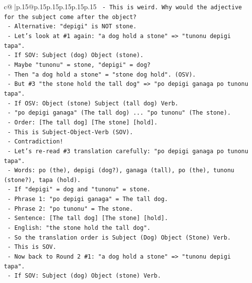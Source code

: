 \documentclass{article}
\begin{document}
{\begin{supertabular}{c@{$\;$}|p{.15\linewidth}@{}p{.15\linewidth}p{.15\linewidth}p{.15\linewidth}p{.15\linewidth}p{.15\linewidth}}
{{{\texttt{      {-} This is weird. Why would the adjective for the subject come after the object?} \\
\texttt{      {-} Alternative: "depigi" is NOT stone.} \\
\texttt{      {-} Let's look at \#1 again: "a dog hold a stone" => "tunonu depigi tapa".} \\
\texttt{      {-} If SOV: Subject (dog) Object (stone).} \\
\texttt{      {-} Maybe "tunonu" = stone, "depigi" = dog?} \\
\texttt{        {-} Then "a dog hold a stone" = "stone dog hold". (OSV).} \\
\texttt{        {-} But \#3 "the stone hold the tall dog" => "po depigi ganaga po tunonu tapa".} \\
\texttt{        {-} If OSV: Object (stone) Subject (tall dog) Verb.} \\
\texttt{        {-} "po depigi ganaga" (The tall dog) ... "po tunonu" (The stone).} \\
\texttt{        {-} Order: {[}The tall dog{]} {[}The stone{]} {[}hold{]}.} \\
\texttt{        {-} This is Subject{-}Object{-}Verb (SOV).} \\
\texttt{        {-} Contradiction!} \\
\texttt{        {-} Let's re{-}read \#3 translation carefully: "po depigi ganaga po tunonu tapa".} \\
\texttt{        {-} Words: po (the), depigi (dog?), ganaga (tall), po (the), tunonu (stone?), tapa (hold).} \\
\texttt{        {-} If "depigi" = dog and "tunonu" = stone.} \\
\texttt{        {-} Phrase 1: "po depigi ganaga" = The tall dog.} \\
\texttt{        {-} Phrase 2: "po tunonu" = The stone.} \\
\texttt{        {-} Sentence: {[}The tall dog{]} {[}The stone{]} {[}hold{]}.} \\
\texttt{        {-} English: "the stone hold the tall dog".} \\
\texttt{        {-} So the translation order is Subject (Dog) Object (Stone) Verb.} \\
\texttt{        {-} This is SOV.} \\
\texttt{        {-} Now back to Round 2 \#1: "a dog hold a stone" => "tunonu depigi tapa".} \\
\texttt{        {-} If SOV: Subject (dog) Object (stone) Verb.} \\
}}}
\end{supertabular}}
\end{document}
